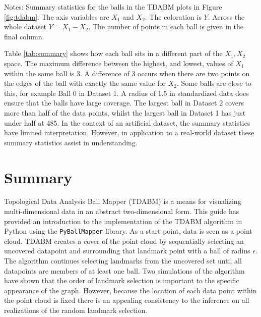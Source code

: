 \documentclass{article}
\begin{document}
\begin{table}
\begin{center}
\begin{tabular}{l l c c c c c c c c c c c c c }
			\hline
		\end{tabular}		
	\end{center}
	\raggedright
	\footnotesize{Notes: Summary statistics for the balls in the TDABM plots in Figure \ref{fig:tdabm}. The axis variables are $X_1$ and $X_2$. The coloration is $Y$. Across the whole dataset $Y = X_1 - X_2$. The number of points in each ball is given in the final column.}
\end{table}

Table \ref{tab:summary} shows how each ball sits in a different part of the $X_1, X_2$ space. The maximum difference between the highest, and lowest, values of $X_1$ within the same ball is 3. A difference of 3 occurs when there are two points on the edges of the ball with exactly the same value for $X_2$. Some balls are close to this, for example Ball 0 in Dataset 1. A radius of 1.5 in standardized data does ensure that the balls have large coverage. The largest ball in Dataset 2 covers more than half of the data points, whilst the largest ball in Dataset 1 has just under half at 485. In the context of an artificial dataset, the summary statistics have limited interpretation. However, in application to a real-world dataset these summary statistics assist in understanding. 

\section{Summary}
\label{sec:summary}

Topological Data Analysis Ball Mapper (TDABM) \citep{dlotko2019ball} is a means for visualizing multi-dimensional data in an abstract two-dimensional form. This guide has provided an introduction to the implementation of the TDABM algorithm in Python using the \texttt{PyBallMapper} library. As a start point, data is seen as a point cloud. TDABM creates a cover of the point cloud by sequentially selecting an uncovered datapoint and surrounding that landmark point with a ball of radius $\epsilon$. The algorithm continues selecting landmarks from the uncovered set until all datapoints are members of at least one ball. Two simulations of the algorithm have shown that the order of landmark selection is important to the specific appearance of the graph. However, because the location of each data point within the point cloud is fixed there is an appealing consistency to the inference on all realizations of the random landmark selection.
\end{document}
